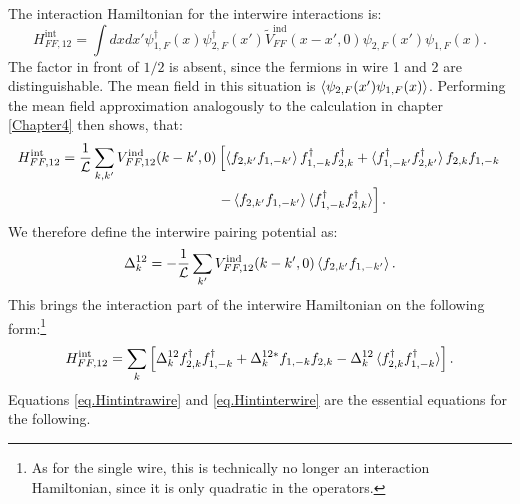 The interaction Hamiltonian for the interwire interactions is:
\begin{equation}
H^\text{int}_{FF,12} = \int dx dx' \psi^\dagger_{1,F}(x)\psi^\dagger_{2,F}(x') \tilde{V}^\text{ind}_{FF}(x-x',0) \psi_{2,F}(x')\psi_{1,F}(x).
\end{equation}
The factor in front of $1/2$ is absent, since the fermions in wire 1 and 2 are distinguishable. The mean field in this situation is $\braket{\psi_{2,F}(x')\psi_{1,F}(x)}$. Performing the mean field approximation analogously to the calculation in chapter \ref{Chapter4} then shows, that:
\begin{align}
H^\text{int}_{FF,12} = \frac{1}{\mathcal{L}} \sum_{k,k'} V^\text{ind}_{FF,12}(k-k',0) & \left[\braket{f_{2,k'}f_{1,-k'}}f^\dagger_{1,-k}f^\dagger_{2,k} + \braket{f^\dagger_{1,-k'}f^\dagger_{2,k'}}f_{2,k}f_{1,-k} \right. \nonumber \\
& \left. - \braket{f_{2,k'}f_{1,-k'}}\braket{f^\dagger_{1,-k}f^\dagger_{2,k}} \right]. \nonumber
\end{align}
We therefore define the interwire pairing potential as:
\begin{equation}
\Delta^{12}_k = -\frac{1}{\mathcal{L}} \sum_{k'} V^\text{ind}_{FF,12}(k-k',0)\braket{f_{2,k'}f_{1,-k'}}.
\end{equation}
This brings the interaction part of the interwire Hamiltonian on the following form:\footnote{As for the single wire, this is technically no longer an interaction Hamiltonian, since it is only quadratic in the operators.}
\begin{equation}
H^\text{int}_{FF,12} = \sum_{k} \left[\Delta^{12}_k f^\dagger_{2,k}f^\dagger_{1,-k} + \Delta^{12 *}_k f_{1,-k}f_{2,k} - \Delta^{12}_k\braket{f^\dagger_{2,k}f^\dagger_{1,-k}} \right].
\label{eq.Hintinterwire}
\end{equation}
Equations \ref{eq.Hintintrawire} and \ref{eq.Hintinterwire} are the essential equations for the following. 

